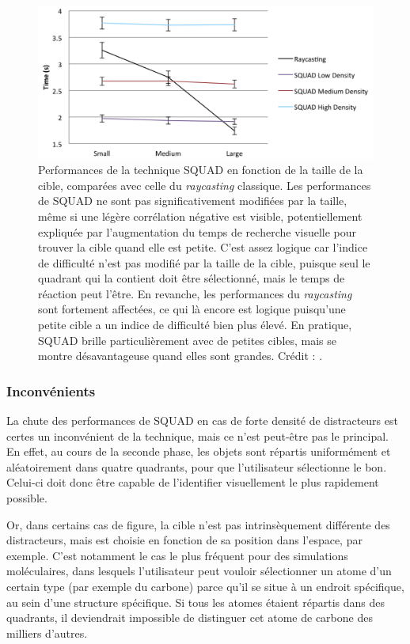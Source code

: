 	\begin{figure}[htb]
		\centering
		\includegraphics[width=\textwidth]{figures/ch2/squadRecap}
		\caption[SQUAD -- résultats : taille]{Performances de la technique SQUAD en fonction de la taille de la cible, comparées avec celle du \emph{raycasting} classique. Les performances de SQUAD ne sont pas significativement modifiées par la taille, même si une légère corrélation négative est visible, potentiellement expliquée par l'augmentation du temps de recherche visuelle pour trouver la cible quand elle est petite. C'est assez logique car l'indice de difficulté n'est pas modifié par la taille de la cible, puisque seul le quadrant qui la contient doit être sélectionné, mais le temps de réaction peut l'être. En revanche, les performances du \emph{raycasting} sont fortement affectées, ce qui là encore est logique puisqu'une petite cible a un indice de difficulté bien plus élevé. En pratique, SQUAD brille particulièrement avec de petites cibles, mais se montre désavantageuse quand elles sont grandes. Crédit : \cite{kopper2011rapid}.}
		\label{fig:squadRecap}
	\end{figure}
	
	\subsubsection{Inconvénients}
	La chute des performances de SQUAD en cas de forte densité de distracteurs est certes un inconvénient de la technique, mais ce n'est peut-être pas le principal. En effet, au cours de la seconde phase, les objets sont répartis uniformément et aléatoirement dans quatre quadrants, pour que l'utilisateur sélectionne le bon. Celui-ci doit donc être capable de l'identifier visuellement le plus rapidement possible.
	
	Or, dans certains cas de figure, la cible n'est pas intrinsèquement différente des distracteurs, mais est choisie en fonction de sa position dans l'espace, par exemple. C'est notamment le cas le plus fréquent pour des simulations moléculaires, dans lesquels l'utilisateur peut vouloir sélectionner un atome d'un certain type (par exemple du carbone) parce qu'il se situe à un endroit spécifique, au sein d'une structure spécifique. Si tous les atomes étaient répartis dans des quadrants, il deviendrait impossible de distinguer cet atome de carbone des milliers d'autres.
	
